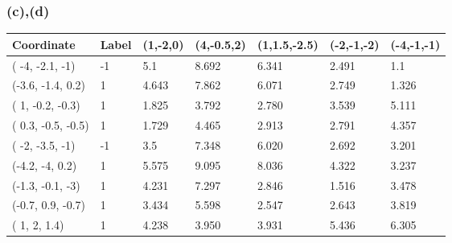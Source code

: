 \documentclass[12pt]{article}
\begin{document}
\subsubsection*{(c),(d)}
\begin{table}[h!]
\begin{tabular}{lllllll}
\hline
Coordinate           & Label & (1,-2,0)                      & (4,-0.5,2)                    & (1,1.5,-2.5)                  & (-2,-1,-2)                    & (-4,-1,-1)                    \\ \hline
( -4, -2.1, -1)      & -1    & 5.1                           & 8.692                         & 6.341                         & \cellcolor[HTML]{FFFE65}2.491 & \cellcolor[HTML]{FFFE65}1.1   \\
(-3.6, -1.4, 0.2)    & 1     & 4.643                         & 7.862                         & 6.071                         & 2.749                         & \cellcolor[HTML]{FFFE65}1.326 \\
( 1, -0.2, -0.3)     & 1     & \cellcolor[HTML]{FFCC67}1.825 & 3.792                         & \cellcolor[HTML]{FFFE65}2.780 & 3.539                         & 5.111                         \\
( 0.3, -0.5, -0.5)   & 1     & \cellcolor[HTML]{FFFE65}1.729 & 4.465                         & 2.913                         & 2.791                         & 4.357                         \\
( -2, -3.5, -1)      & -1    & 3.5                           & 7.348                         & 6.020                         & 2.692                         & \cellcolor[HTML]{FFCC67}3.201 \\
(-4.2, -4, 0.2)      & 1     & 5.575                         & 9.095                         & 8.036                         & 4.322                         & 3.237                         \\
(-1.3, -0.1, -3)     & 1     & 4.231                         & 7.297                         & 2.846                         & \cellcolor[HTML]{FFFE65}1.516 & 3.478                         \\
(-0.7, 0.9, -0.7)    & 1     & 3.434                         & 5.598                         & \cellcolor[HTML]{FFFE65}2.547 & \cellcolor[HTML]{FFCC67}2.643 & 3.819                         \\
( 1, 2, 1.4)         & 1     & 4.238                         & 3.950                         & 3.931                         & 5.436                         & 6.305                         \\

\end{tabular}
\end{table}
\end{document}
